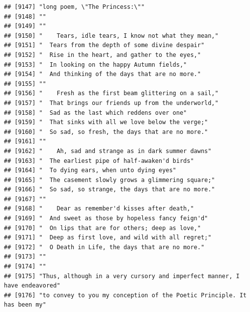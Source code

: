 \documentclass{article}\usepackage[]{graphicx}\usepackage[]{color}
\makeatletter
\newenvironment{kframe}{%
 \def\at@end@of@kframe{}%
 \ifinner\ifhmode%
  \def\at@end@of@kframe{\end{minipage}}%
  \begin{minipage}{\columnwidth}%
 \fi\fi%
 \def\FrameCommand##1{\hskip\@totalleftmargin \hskip-\fboxsep
 \colorbox{shadecolor}{##1}\hskip-\fboxsep
     \hskip-\linewidth \hskip-\@totalleftmargin \hskip\columnwidth}%
 \MakeFramed {\advance\hsize-\width
   \@totalleftmargin\z@ \linewidth\hsize
   \@setminipage}}%
 {\par\unskip\endMakeFramed%
 \at@end@of@kframe}
\newenvironment{knitrout}{}{} %
\makeatother
\begin{document}
\begin{knitrout}
\begin{kframe}
\begin{verbatim}
## [9147] "long poem, \"The Princess:\""                                                
## [9148] ""                                                                            
## [9149] ""                                                                            
## [9150] "    Tears, idle tears, I know not what they mean,"                           
## [9151] "  Tears from the depth of some divine despair"                               
## [9152] "  Rise in the heart, and gather to the eyes,"                                
## [9153] "  In looking on the happy Autumn fields,"                                    
## [9154] "  And thinking of the days that are no more."                                
## [9155] ""                                                                            
## [9156] "    Fresh as the first beam glittering on a sail,"                           
## [9157] "  That brings our friends up from the underworld,"                           
## [9158] "  Sad as the last which reddens over one"                                    
## [9159] "  That sinks with all we love below the verge;"                              
## [9160] "  So sad, so fresh, the days that are no more."                              
## [9161] ""                                                                            
## [9162] "    Ah, sad and strange as in dark summer dawns"                             
## [9163] "  The earliest pipe of half-awaken'd birds"                                  
## [9164] "  To dying ears, when unto dying eyes"                                       
## [9165] "  The casement slowly grows a glimmering square;"                            
## [9166] "  So sad, so strange, the days that are no more."                            
## [9167] ""                                                                            
## [9168] "    Dear as remember'd kisses after death,"                                  
## [9169] "  And sweet as those by hopeless fancy feign'd"                              
## [9170] "  On lips that are for others; deep as love,"                                
## [9171] "  Deep as first love, and wild with all regret;"                             
## [9172] "  O Death in Life, the days that are no more."                               
## [9173] ""                                                                            
## [9174] ""                                                                            
## [9175] "Thus, although in a very cursory and imperfect manner, I have endeavored"    
## [9176] "to convey to you my conception of the Poetic Principle. It has been my"      

\end{verbatim}
\end{kframe}
\end{knitrout}
\end{document}
